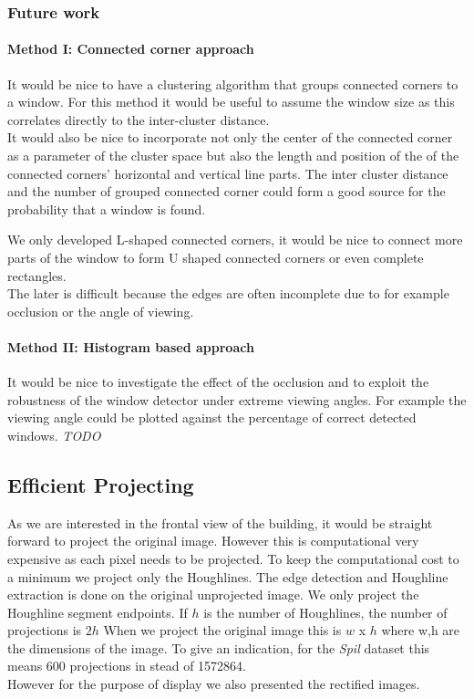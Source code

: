 \subsubsection{Future work}
\paragraph{Method I: Connected corner approach} 
It would be nice to have a clustering algorithm that groups connected corners to
a window. For this method it would be useful to assume the window size as this
correlates directly to the inter-cluster distance.\\

It would also be nice to incorporate not only the center of the connected corner
as a parameter of the cluster space but also the length and position of the of
the connected corners' horizontal and vertical line parts.  The inter cluster
distance and the number of grouped connected corner could form a good source for
the probability that a window is found.

We only developed L-shaped connected corners, it would be nice to connect more
parts of the window to form U shaped connected corners or even complete rectangles.\\
The later is difficult because the edges are often incomplete due to for example occlusion 
or the angle of viewing.


\paragraph{Method II: Histogram based approach} 
It would be nice to investigate the effect of the occlusion and to exploit the
robustness of the window detector under extreme viewing angles.
For example the viewing angle could be plotted against the percentage of
correct detected windows.
\emph{TODO}






\subsection{Efficient Projecting} 
As we are interested in the frontal view of the building, it would be straight
forward to project the original image. However this is computational
very expensive as each pixel needs to be projected. To keep the computational cost to a minimum we project only the
Houghlines. The edge detection and Houghline extraction is done on the original
unprojected image. We only project the Houghline segment
endpoints. If $h$ is the number of Houghlines, the number of projections is $2h$
When we project the original image this is $w$ x $h$ where w,h are the dimensions of
the image. To give an indication, for the \emph{Spil} dataset %
this means 600 projections in stead of 1572864.\\
However for the purpose of display we also presented the rectified images.




